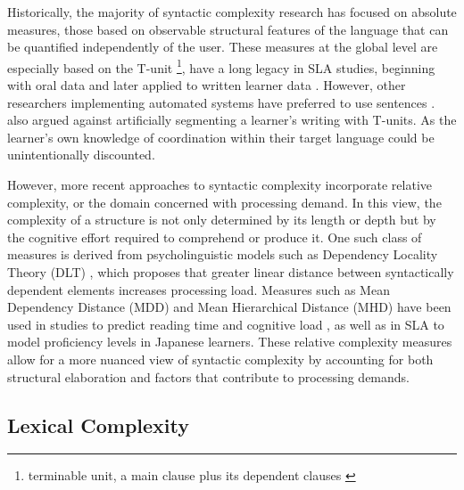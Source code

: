 Historically, the majority of syntactic complexity research has focused on absolute measures, those
based on observable structural features of the language that can be quantified independently of the user. These
measures at the global level are especially based on the T-unit
\footnote{terminable unit, a main clause plus its dependent clauses
\cite{hunt1965}}, have a long legacy in SLA studies, beginning with oral data \citep{hunt1965} and later applied to
written learner data \citep{Ortega2003,Lu2011}. However, other researchers implementing automated systems have
preferred to use sentences \citep{Vyatkina2012,Lu2010}. \citet{Bardovi-Harlig1992} also argued against
artificially segmenting a learner's writing with T-units. As the learner's own knowledge of coordination within
their target language could be unintentionally discounted.

However, more recent approaches to syntactic complexity incorporate relative complexity, or the domain concerned
with processing demand. In this view, the complexity of a structure is not only determined by its length or depth
but by the cognitive effort required to comprehend or produce it. One such class of measures is derived from
psycholinguistic models such as Dependency Locality Theory (DLT) \citep{Gibson2000}, which proposes that greater
linear distance
between syntactically dependent elements increases processing load. Measures such as Mean Dependency Distance (MDD)\citep{Liu2008} and Mean Hierarchical Distance (MHD) \citep{Liu2017} have been used in studies to predict reading time and cognitive load \citep{shain2016, Feng2009}, as well as in SLA to model proficiency levels in Japanese learners\citep{Jiang2019,komori2019,Yang2023}. These relative complexity measures allow for a more nuanced view of syntactic complexity by accounting for both structural elaboration and factors that contribute to processing demands.


\subsection{Lexical Complexity}

